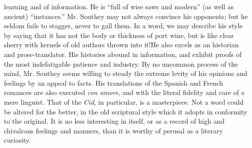learning and of information. He is ``full of wise saws and modern'' (as
well as ancient) ``instances.'' Mr. Southey may not always convince his
opponents; but he seldom fails to stagger, never to gall them. In a
word, we may describe his style by saying that it has not the body or
thickness of port wine, but is like clear sherry with kernels of
old authors thrown into it!\textemdash He also excels as an historian and
prose-translator. His histories abound in information, and exhibit
proofs of the most indefatigable patience and industry. By no uncommon
process of the mind, Mr. Southey seems willing to steady the extreme
levity of his opinions and feelings by an appeal to facts. His
translations of the Spanish and French romances are also executed \emph{con
amore}, and with the literal fidelity and care of a mere linguist. That
of the \emph{Cid}, in particular, is a masterpiece. Not a word could be
altered for the better, in the old scriptural style which it adopts in
conformity to the original. It is no less interesting in itself, or as a
record of high and chivalrous feelings and manners, than it is worthy of
perusal as a literary curiosity.

